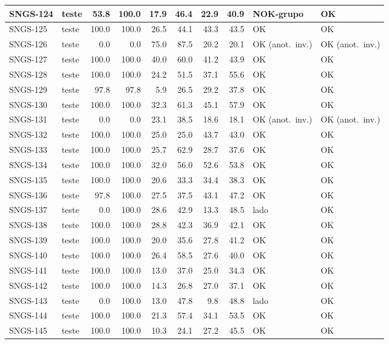 \begin{small}
\begin{longtable}{|l|l|r|r|r|r|r|r|l|l|}
SNGS-124 & teste & 53.8 & 100.0 & 17.9 & 46.4 & 22.9 & 40.9 & NOK-grupo & OK \\ \hline
SNGS-125 & teste & 100.0 & 100.0 & 26.5 & 44.1 & 43.3 & 43.5 & OK & OK \\ \hline
SNGS-126 & teste & 0.0 & 0.0 & 75.0 & 87.5 & 20.2 & 20.1 & OK (anot.\ inv.) & OK (anot.\ inv.) \\ \hline
SNGS-127 & teste & 100.0 & 100.0 & 40.0 & 60.0 & 41.2 & 43.9 & OK & OK \\ \hline
SNGS-128 & teste & 100.0 & 100.0 & 24.2 & 51.5 & 37.1 & 55.6 & OK & OK \\ \hline
SNGS-129 & teste & 97.8 & 97.8 & 5.9 & 26.5 & 29.2 & 37.8 & OK & OK \\ \hline
SNGS-130 & teste & 100.0 & 100.0 & 32.3 & 61.3 & 45.1 & 57.9 & OK & OK \\ \hline
SNGS-131 & teste & 0.0 & 0.0 & 23.1 & 38.5 & 18.6 & 18.1 & OK (anot.\ inv.) & OK (anot.\ inv.) \\ \hline
SNGS-132 & teste & 100.0 & 100.0 & 25.0 & 25.0 & 43.7 & 43.0 & OK & OK \\ \hline
SNGS-133 & teste & 100.0 & 100.0 & 25.7 & 62.9 & 28.7 & 37.6 & OK & OK \\ \hline
SNGS-134 & teste & 100.0 & 100.0 & 32.0 & 56.0 & 52.6 & 53.8 & OK & OK \\ \hline
SNGS-135 & teste & 100.0 & 100.0 & 20.6 & 33.3 & 34.4 & 38.3 & OK & OK \\ \hline
SNGS-136 & teste & 97.8 & 100.0 & 27.5 & 37.5 & 43.1 & 47.2 & OK & OK \\ \hline
SNGS-137 & teste & 0.0 & 100.0 & 28.6 & 42.9 & 13.3 & 48.5 & lado & OK \\ \hline
SNGS-138 & teste & 100.0 & 100.0 & 28.8 & 42.3 & 36.9 & 42.1 & OK & OK \\ \hline
SNGS-139 & teste & 100.0 & 100.0 & 20.0 & 35.6 & 27.8 & 41.2 & OK & OK \\ \hline
SNGS-140 & teste & 100.0 & 100.0 & 26.4 & 58.5 & 27.6 & 40.0 & OK & OK \\ \hline
SNGS-141 & teste & 100.0 & 100.0 & 13.0 & 37.0 & 25.0 & 34.3 & OK & OK \\ \hline
SNGS-142 & teste & 100.0 & 100.0 & 14.3 & 26.8 & 27.0 & 37.1 & OK & OK \\ \hline
SNGS-143 & teste & 0.0 & 100.0 & 13.0 & 47.8 & 9.8 & 48.8 & lado & OK \\ \hline
SNGS-144 & teste & 100.0 & 100.0 & 21.3 & 57.4 & 34.1 & 53.5 & OK & OK \\ \hline
SNGS-145 & teste & 100.0 & 100.0 & 10.3 & 24.1 & 27.2 & 45.5 & OK & OK \\ \hline

\end{longtable}
\end{small}
